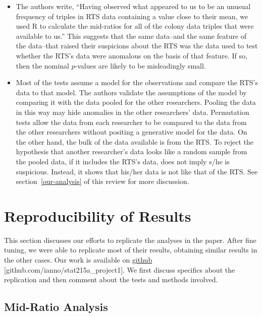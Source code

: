 \documentclass{article}
\begin{document}
\begin{itemize}
\item
  The authors write, “Having observed what appeared to us to be an unusual frequency of triples in RTS data containing a value close to their mean, we used R to calculate the mid-ratios for all of the colony data triples that were available to us.” This suggests that the same data--and the same feature of the data--that raised their suspicions about the RTS was the data used to test whether the RTS's data were anomalous on the basis of that feature. If so, then the nominal $p$-values are likely to be misleadingly small.

\item
  Most of the tests assume a model for the observations and compare the RTS's data to that model.
  The authors validate the assumptions of the model by comparing it with the data pooled for the other researchers.
  Pooling the data in this way may hide anomalies in the other researchers' data.
  Permutation tests allow the data from each researcher to be compared to the data from the other researchers without positing a generative model for the data.
  On the other hand, the bulk of the data available is from the RTS.
  To reject the hypothesis that another researcher's data looks like a random sample from the pooled data, if it includes the RTS's data, does not imply s/he is suspicious.
  Instead, it shows that his/her data is not like that of the RTS.
  See section~\ref{our-analysis} of this review for more discussion.
\end{itemize}

    \section{Reproducibility of Results}\label{reproducibility-of-results}

This section discusses our efforts to replicate the analyses in the paper.
After fine tuning, we were able to replicate most of
their results, obtaining similar results in the other cases.
Our work is available on \hyperlink{https://github.com/ianno/stat215a_project1}{github} [github.com/ianno/stat215a\_project1]. We first discuss specifics about the replication and then comment about the tests and methods involved.


    \subsection{Mid-Ratio Analysis}\label{mid-ratio-analysis}
\end{document}
